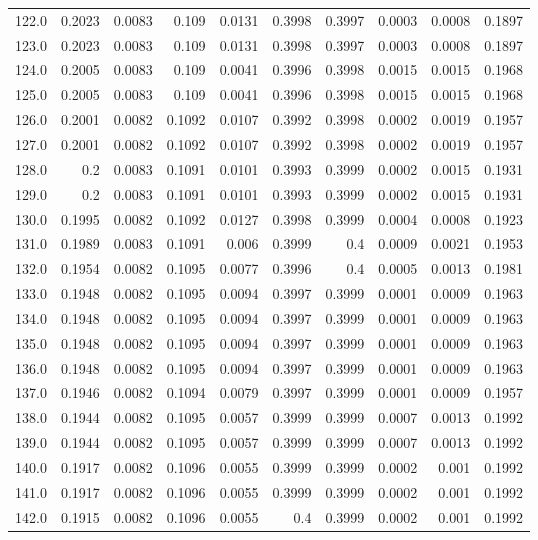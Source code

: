 \begin{longtable}{lrrrrrrrrr}
122.0 & 0.2023 & 0.0083 & 0.109 & 0.0131 & 0.3998 & 0.3997 & 0.0003 & 0.0008 & 0.1897 \\
123.0 & 0.2023 & 0.0083 & 0.109 & 0.0131 & 0.3998 & 0.3997 & 0.0003 & 0.0008 & 0.1897 \\
124.0 & 0.2005 & 0.0083 & 0.109 & 0.0041 & 0.3996 & 0.3998 & 0.0015 & 0.0015 & 0.1968 \\
125.0 & 0.2005 & 0.0083 & 0.109 & 0.0041 & 0.3996 & 0.3998 & 0.0015 & 0.0015 & 0.1968 \\
126.0 & 0.2001 & 0.0082 & 0.1092 & 0.0107 & 0.3992 & 0.3998 & 0.0002 & 0.0019 & 0.1957 \\
127.0 & 0.2001 & 0.0082 & 0.1092 & 0.0107 & 0.3992 & 0.3998 & 0.0002 & 0.0019 & 0.1957 \\
128.0 & 0.2 & 0.0083 & 0.1091 & 0.0101 & 0.3993 & 0.3999 & 0.0002 & 0.0015 & 0.1931 \\
129.0 & 0.2 & 0.0083 & 0.1091 & 0.0101 & 0.3993 & 0.3999 & 0.0002 & 0.0015 & 0.1931 \\
130.0 & 0.1995 & 0.0082 & 0.1092 & 0.0127 & 0.3998 & 0.3999 & 0.0004 & 0.0008 & 0.1923 \\
131.0 & 0.1989 & 0.0083 & 0.1091 & 0.006 & 0.3999 & 0.4 & 0.0009 & 0.0021 & 0.1953 \\
132.0 & 0.1954 & 0.0082 & 0.1095 & 0.0077 & 0.3996 & 0.4 & 0.0005 & 0.0013 & 0.1981 \\
133.0 & 0.1948 & 0.0082 & 0.1095 & 0.0094 & 0.3997 & 0.3999 & 0.0001 & 0.0009 & 0.1963 \\
134.0 & 0.1948 & 0.0082 & 0.1095 & 0.0094 & 0.3997 & 0.3999 & 0.0001 & 0.0009 & 0.1963 \\
135.0 & 0.1948 & 0.0082 & 0.1095 & 0.0094 & 0.3997 & 0.3999 & 0.0001 & 0.0009 & 0.1963 \\
136.0 & 0.1948 & 0.0082 & 0.1095 & 0.0094 & 0.3997 & 0.3999 & 0.0001 & 0.0009 & 0.1963 \\
137.0 & 0.1946 & 0.0082 & 0.1094 & 0.0079 & 0.3997 & 0.3999 & 0.0001 & 0.0009 & 0.1957 \\
138.0 & 0.1944 & 0.0082 & 0.1095 & 0.0057 & 0.3999 & 0.3999 & 0.0007 & 0.0013 & 0.1992 \\
139.0 & 0.1944 & 0.0082 & 0.1095 & 0.0057 & 0.3999 & 0.3999 & 0.0007 & 0.0013 & 0.1992 \\
140.0 & 0.1917 & 0.0082 & 0.1096 & 0.0055 & 0.3999 & 0.3999 & 0.0002 & 0.001 & 0.1992 \\
141.0 & 0.1917 & 0.0082 & 0.1096 & 0.0055 & 0.3999 & 0.3999 & 0.0002 & 0.001 & 0.1992 \\
142.0 & 0.1915 & 0.0082 & 0.1096 & 0.0055 & 0.4 & 0.3999 & 0.0002 & 0.001 & 0.1992 \\

\end{longtable}
